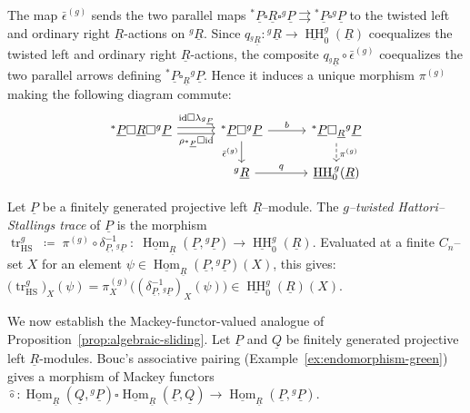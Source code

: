 \documentclass[11pt,oneside]{amsart}
\DeclareMathOperator{\Hom}{Hom}
\DeclareMathOperator{\HH}{HH}
\numberwithin{equation}{section}
\numberwithin{figure}{section}
\theoremstyle{plain}
\theoremstyle{definition}
\theoremstyle{remark}
\begin{document}
The map \(\bar{\epsilon}^{(g)}\) sends the two  parallel maps  ${}^{*}\underline{P}\square \underline{R}\square {}^{g}\underline{P}\rightrightarrows{}^{*}\underline{P}\square {}^{g}\underline{P}$ to the
twisted left and ordinary right \(\underline R\)-actions on
\({}^g\underline R\). 
Since
\(q_{{}^g\underline R}:{}^g\underline R\to
\underline{\HH}_0^g(\underline R)\)
coequalizes the twisted left and ordinary right
\(\underline R\)-actions, the composite
\(q_{{}^g\underline R}\circ\bar\epsilon^{(g)}\) coequalizes the two
parallel arrows defining
\({}^*\underline P\square_{\underline R}{}^g\underline P\).
Hence it induces a unique morphism
\(\pi^{(g)}\) making the following diagram commute:
\begin{equation}\label{diag:twisted-pi-definition}
\begin{tikzcd}[column sep=3em,row sep=1.5em]
{}^{*}\underline{P}\square \underline R \square {}^g\underline{P}
  \ar[r,shift left=.55ex,"\mathrm{id}\square \lambda_{{}^{g}\underline{P}}"]
  \ar[r,shift right=.55ex,swap,"\rho_{{}^{*}\underline{P}}\square\mathrm{id}"]
&
{}^{*}\underline{P}\square {}^g\underline{P}
\ar[r,"b"]
  \ar[d,"\bar{\epsilon}^{(g)}"']
&
{}^{*}\underline{P}\square_{\underline R}{}^g\underline{P}
  \ar[d,dashed,"\pi^{(g)}"]
\\
{} &
{}^{g}\underline R
  \ar[r,"q"]
&
\underline{\HH}_0^{\,g}(\underline{R})
\end{tikzcd}
\end{equation}


\begin{definition}\label{def:twisted-trace-hom-morphism}
Let $\underline{P}$ be a finitely generated projective left $\underline{R}$--module. The \emph{$g$--twisted Hattori--Stallings trace} of $\underline P$ is the morphism
$\operatorname{tr}_{\mathrm{HS}}^{g} \;\coloneqq\; \pi^{(g)} \circ \delta_{\underline{P},\,{}^{g}\underline{P}}^{-1} \;:\; \underline{\Hom}_{\underline{R}}(\underline{P}, {}^{g}\underline{P}) \to \underline{\HH}_0^{g}(\underline{R}).$
Evaluated at a finite $C_n$--set $X$ for an element $\psi\in \underline{\Hom}_{\underline{R}}(\underline{P}, {}^{g}\underline{P})(X)$, this gives:
$
\bigl(\operatorname{tr}_{\mathrm{HS}}^g\bigr)_X(\psi) = \pi_X^{(g)}\!\bigl( (\delta_{\underline{P},\,{}^{g}\underline{P}}^{-1})_X(\psi) \bigr) \in \underline{\HH}_0^{g}(\underline{R})(X).
$
\end{definition}

We now establish the Mackey-functor-valued analogue of
Proposition~\ref{prop:algebraic-sliding}. Let \(\underline P\) and
\(\underline Q\) be finitely generated projective left
\(\underline R\)-modules. Bouc's associative pairing
(Example~\ref{ex:endomorphism-green}) gives a morphism of Mackey
functors
\(
\hat\circ\colon
\underline{\Hom}_{\underline R}(\underline Q,{}^g\underline P)
\square
\underline{\Hom}_{\underline R}(\underline P,\underline Q)
\to
\underline{\Hom}_{\underline R}(\underline P,{}^g\underline P).
\)
\end{document}
